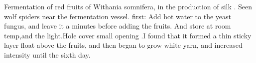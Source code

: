 Fermentation of red fruits of Withania somnifera, in the production of silk .
Seen wolf spiders near the fermentation vessel.
first: Add hot water to the yeast fungus, and leave it a minutes before adding the fruits. And store at room temp,and the light.Hole cover small opening .I found that it formed a thin sticky layer float above the fruits, and then began to grow white yarn, and increased intensity until the sixth day.  